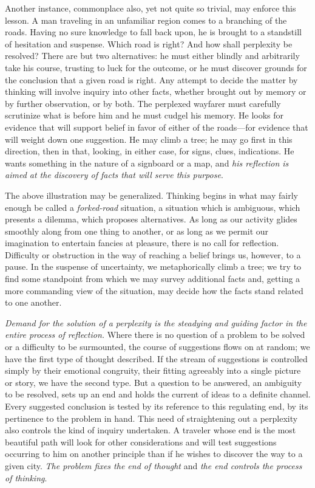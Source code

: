 \documentclass[letterpaper]{book}
\begin{document}
Another instance, commonplace also, yet not quite so trivial, may
enforce this lesson. A man traveling in an unfamiliar region comes to a
branching of the roads. Having no sure knowledge to fall back upon, he
is brought to a standstill of hesitation and suspense. Which road is
right? And how shall perplexity be resolved? There are but two
alternatives: he must either blindly and arbitrarily take his course,
trusting to luck for the outcome, or he must discover grounds for the
conclusion that a given road is right. Any attempt to decide the matter
by thinking will involve inquiry into other facts, whether brought out
by memory or by further observation, or by both. The perplexed wayfarer
must carefully scrutinize what is before him and he must cudgel his
memory. He looks for evidence that will support belief in favor of
either of the roads---for evidence that will weight down one suggestion.
He may climb a tree; he may go first in this direction, then in that,
looking, in either case, for signs,
clues,
indications. He wants something in the nature of a signboard or a map,
and \emph{his reflection is aimed at the discovery of facts that will
serve this purpose}.


The above illustration may be generalized. Thinking begins in what may
fairly enough be called a \emph{forked-road} situation, a situation
which is ambiguous, which presents a dilemma, which proposes
alternatives. As long as our activity glides smoothly along from one
thing to another, or as long as we permit our imagination to entertain
fancies at pleasure, there is no call for reflection. Difficulty or
obstruction in the way of reaching a belief brings us, however, to a
pause. In the suspense of uncertainty, we metaphorically climb a tree;
we try to find some standpoint from which we may survey additional facts
and, getting a more commanding view of the situation, may decide how the
facts stand related to one another.


\emph{Demand for the solution of a perplexity is the steadying and
guiding factor in the entire process of reflection.} Where there is no
question of a problem to be solved or a difficulty to be surmounted, the
course of suggestions flows on at random; we have the first type of
thought described. If the stream of suggestions is controlled simply by
their emotional congruity, their fitting agreeably into a single picture
or story, we have the second type. But a question to be answered, an
ambiguity to be resolved, sets up an end and holds the current of ideas
to a definite channel. Every suggested conclusion is tested by its
reference to this regulating end, by its pertinence to the problem in
hand. This need of straightening out a perplexity also controls the kind
of inquiry undertaken. A traveler whose end is the most beautiful path
will look for other considerations
and
will test suggestions occurring to him on another principle than if he
wishes to discover the way to a given city. \emph{The problem fixes the
end of thought} and \emph{the end controls the process of thinking}.
\end{document}
